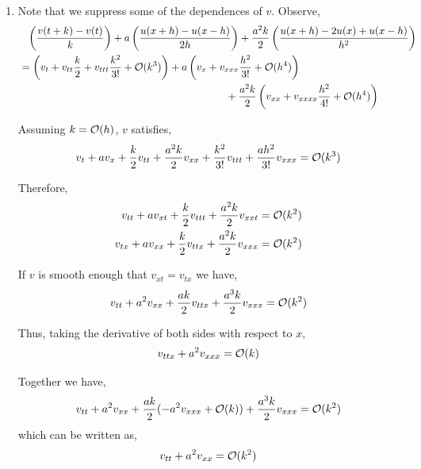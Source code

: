 \documentclass[10pt]{article}
\begin{document}
\begin{solution}[Solution]
\begin{enumerate}[label=(\alph*)]
    \item 
        Note that we suppress some of the dependences of \( v \). Observe,
        \begin{align*}
            &\phantom{=} \left( \frac{v(t+k)-v(t)}{k} \right) + a \left( \frac{u(x+h)-u(x-h)}{2h} \right) + \frac{a^2k}{2} \left( \frac{u(x+h)-2u(x)+u(x-h)}{h^2} \right) 
            \\&= \left( v_t + v_{tt} \frac{k}{2} + v_{ttt} \frac{k^2}{3!} + \cO(k^3) \right)
             + a \left( v_x + v_{xxx} \frac{h^2}{3!} + \cO(h^4) \right)
            \\&\hspace{20em}+ \frac{a^2k}{2} \left( v_{xx} + v_{xxxx} \frac{h^2}{4!} + \cO(h^4) \right)
        \end{align*}
        
        Assuming \( k = \mathcal{O}(h) \), \( v \) satisfies,
        \begin{align*}
            v_t + a v_x + \frac{k}{2}v_{tt} + \frac{a^2k}{2}v_{xx}+ \frac{k^2}{3!} v_{ttt} + \frac{ah^2}{3!} v_{xxx} = \mathcal{O}(k^3)
        \end{align*}
        
        Therefore,
        \begin{align*}
            v_{tt} + av_{xt} + \frac{k}{2}v_{ttt} + \frac{a^2k}{2}v_{xxt} &= \mathcal{O}(k^2)
            \\v_{tx} + av_{xx} + \frac{k}{2}v_{ttx} + \frac{a^2k}{2}v_{xxx} &= \mathcal{O}(k^2)
        \end{align*}

        If \( v \) is smooth enough that \( v_{xt} = v_{tx} \) we have,
        \begin{align*}
            v_{tt} + a^2v_{xx} + \frac{ak}{2}v_{ttx} + \frac{a^3k}{2}v_{xxx} = \mathcal{O}(k^2)
        \end{align*}
        
        Thus, taking the derivative of both sides with respect to \( x \),
        \begin{align*}
            v_{ttx} + a^2v_{xxx} = \mathcal{O}(k)
        \end{align*}

        Together we have,
        \begin{align*}
            v_{tt} + a^2 v_{xx} + \frac{ak}{2} (-a^2v_{xxx} + \mathcal{O}(k)) + \frac{a^3k}{2}v_{xxx} = \mathcal{O}(k^2)
        \end{align*}
        which can be written as,
        \begin{align*}
            v_{tt} + a^2 v_{xx}  = \mathcal{O}(k^2)
        \end{align*}
        

\end{enumerate}
\end{solution}
\end{document}
